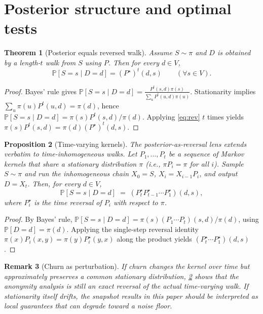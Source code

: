 \documentclass[11pt]{article}
\newtheorem{theorem}{Theorem}[section]
\newtheorem{proposition}[theorem]{Proposition}
\newtheorem{remark}[theorem]{Remark}
\newcommand{\Prb}{\mathbb{P}}
\begin{document}
\section{Posterior structure and optimal tests}\label{sec:posterior}
\begin{theorem}[Posterior equals reversed walk]\label{thm:posterior}
Assume $S\sim \pi$ and $D$ is obtained by a length-$t$ walk from $S$ using $P$.
Then for every $d\in V$,
\[
\Prb[S=s\mid D=d] = (P^\star)^t(d,s)\qquad(\forall s\in V).
\]
\end{theorem}
\begin{proof}
Bayes' rule gives
$\Prb[S=s\mid D=d]=\frac{P^t(s,d)\pi(s)}{\sum_u P^t(u,d)\pi(u)}$.
Stationarity implies $\sum_u \pi(u)P^t(u,d)=\pi(d)$, hence
$\Prb[S=s\mid D=d]=\pi(s)P^t(s,d)/\pi(d)$. Applying \eqref{eq:rev} $t$ times
yields $\pi(s)P^t(s,d)=\pi(d)(P^\star)^t(d,s)$.
\end{proof}

\begin{proposition}[Time-varying kernels]\label{prop:inhom}
The posterior-as-reversal lens extends verbatim to time-inhomogeneous walks.
Let $P_1,\dots,P_t$ be a sequence of Markov kernels that share a stationary
distribution $\pi$ (i.e., $\pi P_i=\pi$ for all $i$). Sample $S\sim\pi$ and run
the inhomogeneous chain $X_0=S$, $X_{i}=X_{i-1}P_i$, and output $D=X_t$.
Then, for every $d\in V$,
\[
\Prb[S=s\mid D=d] \;=\; (P_t^\star P_{t-1}^\star\cdots P_1^\star)(d,s),
\]
where $P_i^\star$ is the time reversal of $P_i$ with respect to $\pi$.
\end{proposition}

\begin{proof}
By Bayes' rule,
$\Prb[S=s\mid D=d]=\pi(s)(P_1\cdots P_t)(s,d)/\pi(d)$, using $\Prb[D=d]=\pi(d)$.
Applying the single-step reversal identity $\pi(x)P_i(x,y)=\pi(y)P_i^\star(y,x)$
along the product yields $(P_t^\star\cdots P_1^\star)(d,s)$.
\end{proof}

\begin{remark}[Churn as perturbation]
If churn changes the kernel over time but approximately preserves a common
stationary distribution, \cref{prop:inhom} shows that the anonymity analysis is
still an exact reversal of the \emph{actual} time-varying walk.
If stationarity itself drifts, the snapshot results in this paper should be
interpreted as local guarantees that can degrade toward a noise floor.
\end{remark}
\end{document}
